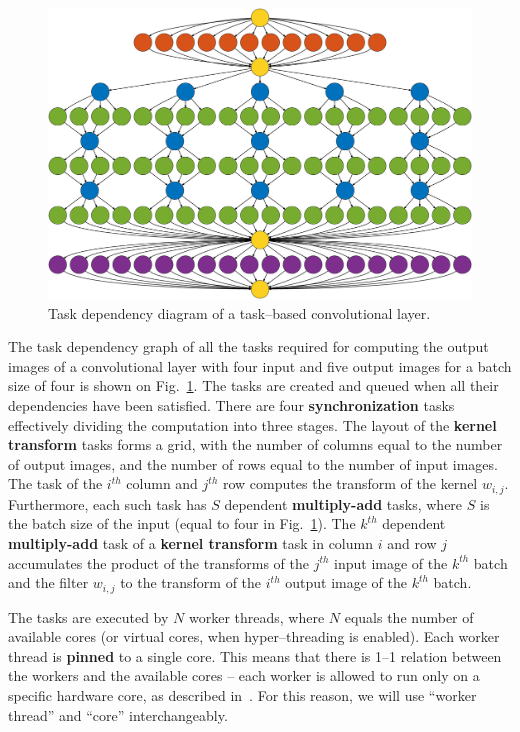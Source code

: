 \documentclass[conference]{./IEEEtran/IEEEtran}
\begin{document}
  \begin{figure}
    \begin{center}
      \includegraphics[width=0.85\columnwidth]{fig/deps}
    \end{center}
    \caption{Task dependency diagram of a task--based convolutional
      layer.}
    \label{fig:task_deps}
  \end{figure}


  The task dependency graph of all the tasks required for computing
  the output images of a convolutional layer with four input and five
  output images for a batch size of four is shown on
  Fig.~\ref{fig:task_deps}.  The tasks are created and queued when all
  their dependencies have been satisfied.  There are four {\bf
    synchronization} tasks effectively dividing the computation into
  three stages.  The layout of the {\bf kernel transform} tasks forms
  a grid, with the number of columns equal to the number of output
  images, and the number of rows equal to the number of input images.
  The task of the $i^{th}$ column and $j^{th}$ row computes the
  transform of the kernel $w_{i,j}$.  Furthermore, each such task has
  $S$ dependent {\bf multiply-add} tasks, where $S$ is the batch size
  of the input (equal to four in Fig.~\ref{fig:task_deps}).  The
  $k^{th}$ dependent {\bf multiply-add} task of a {\bf kernel
    transform} task in column $i$ and row $j$ accumulates the product
  of the transforms of the $j^{th}$ input image of the $k^{th}$ batch
  and the filter $w_{i,j}$ to the transform of the $i^{th}$ output
  image of the $k^{th}$ batch.

  The tasks are executed by $N$ worker threads, where $N$ equals the
  number of available cores (or virtual cores, when hyper--threading
  is enabled).  Each worker thread is {\bf pinned} to a single core.
  This means that there is 1--1 relation between the workers and the
  available cores -- each worker is allowed to run only on a specific
  hardware core, as described in~\cite{jeffers2015high}.  For this
  reason, we will use ``worker thread'' and ``core'' interchangeably.
\end{document}
